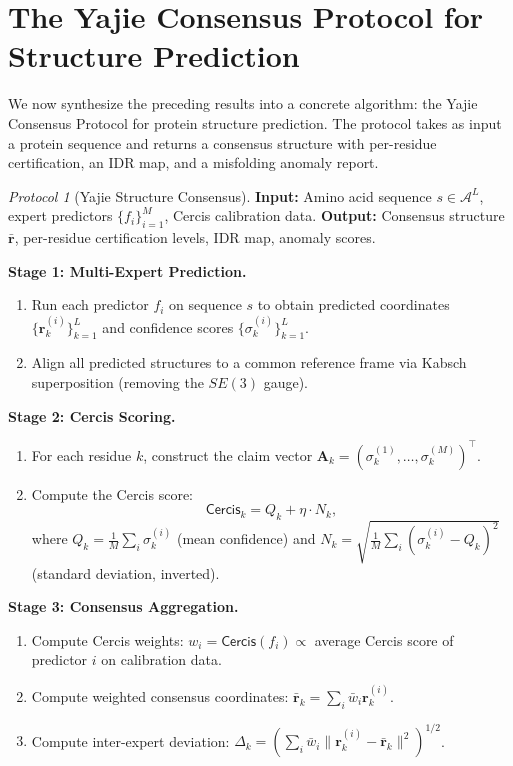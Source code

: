 \documentclass[12pt,a4paper]{article}
\theoremstyle{remark}
\newtheorem{protocol}[theorem]{Protocol}
\newcommand{\Cercis}{\textsf{Cercis}}
\newcommand{\Yajie}{\textsf{Yajie}}
\begin{document}
\section{The Yajie Consensus Protocol for Structure Prediction}
\label{sec:yajie}

We now synthesize the preceding results into a concrete algorithm: the \Yajie{} Consensus Protocol for protein structure prediction.
The protocol takes as input a protein sequence and returns a consensus structure with per-residue certification, an IDR map, and a misfolding anomaly report.

\begin{protocol}[Yajie Structure Consensus]
\label{prot:yajie-struct}
\textbf{Input:} Amino acid sequence $s \in \mathcal{A}^L$, expert predictors $\{f_i\}_{i=1}^{M}$, Cercis calibration data.
\textbf{Output:} Consensus structure $\bar{\mathbf{r}}$, per-residue certification levels, IDR map, anomaly scores.

\medskip\noindent\textbf{Stage 1: Multi-Expert Prediction.}
\begin{enumerate}[leftmargin=*]
    \item Run each predictor $f_i$ on sequence $s$ to obtain predicted coordinates $\{\mathbf{r}_k^{(i)}\}_{k=1}^{L}$ and confidence scores $\{\sigma_k^{(i)}\}_{k=1}^{L}$.
    \item Align all predicted structures to a common reference frame via Kabsch superposition (removing the $SE(3)$ gauge).
\end{enumerate}

\medskip\noindent\textbf{Stage 2: Cercis Scoring.}
\begin{enumerate}[leftmargin=*]
    \item For each residue $k$, construct the claim vector $\mathbf{A}_k = (\sigma_k^{(1)}, \dots, \sigma_k^{(M)})^\top$.
    \item Compute the Cercis score:
    \begin{equation}
        \Cercis_k = Q_k + \eta \cdot N_k,
    \end{equation}
    where $Q_k = \frac{1}{M}\sum_i \sigma_k^{(i)}$ (mean confidence) and $N_k = \sqrt{\frac{1}{M}\sum_i (\sigma_k^{(i)} - Q_k)^2}$ (standard deviation, inverted).
\end{enumerate}

\medskip\noindent\textbf{Stage 3: Consensus Aggregation.}
\begin{enumerate}[leftmargin=*]
    \item Compute Cercis weights: $w_i = \Cercis(f_i) \propto$ average Cercis score of predictor $i$ on calibration data.
    \item Compute weighted consensus coordinates: $\bar{\mathbf{r}}_k = \sum_i \bar{w}_i \mathbf{r}_k^{(i)}$.
    \item Compute inter-expert deviation: $\Delta_k = (\sum_i \bar{w}_i \|\mathbf{r}_k^{(i)} - \bar{\mathbf{r}}_k\|^2)^{1/2}$.
\end{enumerate}


\end{protocol}
\end{document}
